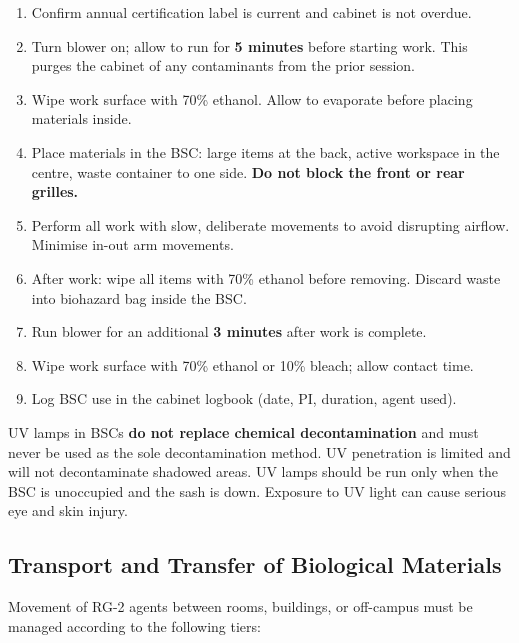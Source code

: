 \begin{procedurebox}
\begin{enumerate}[leftmargin=1.6em, itemsep=3pt,
                  label=\textbf{\color{BSLmid}\arabic*.}]
  \item Confirm annual certification label is current and cabinet is not overdue.
  \item Turn blower on; allow to run for \textbf{5 minutes} before starting work.
        This purges the cabinet of any contaminants from the prior session.
  \item Wipe work surface with 70\% ethanol. Allow to evaporate before placing
        materials inside.
  \item Place materials in the BSC: large items at the back, active workspace in
        the centre, waste container to one side. \textbf{Do not block the front or rear grilles.}
  \item Perform all work with slow, deliberate movements to avoid disrupting airflow.
        Minimise in-out arm movements.
  \item After work: wipe all items with 70\% ethanol before removing. Discard waste
        into biohazard bag inside the BSC.
  \item Run blower for an additional \textbf{3 minutes} after work is complete.
  \item Wipe work surface with 70\% ethanol or 10\% bleach; allow contact time.
  \item Log BSC use in the cabinet logbook (date, PI, duration, agent used).
\end{enumerate}
\end{procedurebox}

\begin{warningbox}
\small
UV lamps in BSCs \textbf{do not replace chemical decontamination} and must never be
used as the sole decontamination method. UV penetration is limited and will not
decontaminate shadowed areas. UV lamps should be run only when the BSC is unoccupied
and the sash is down. Exposure to UV light can cause serious eye and skin injury.
\end{warningbox}

\subsection{Transport and Transfer of Biological Materials}

Movement of RG-2 agents between rooms, buildings, or off-campus must be managed
according to the following tiers:


